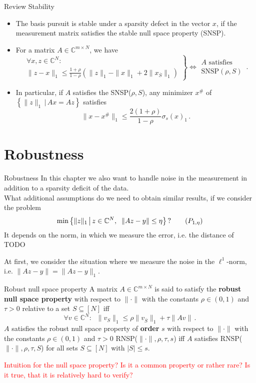 \documentclass[11pt]{beamer}
\newcommand{\CC}{\mathbb{C}}
\renewcommand{\emph}{\textbf}
\begin{document}
\begin{frame}{Review Stability}
	\begin{itemize}
		\item The basis pursuit is stable under a sparsity defect in the vector \(x\), if the measurement matrix satisfies the stable null space property (SNSP).
		\item For a matrix \(A\in\CC^{m\times N}\), we have
\[\left.\begin{array}{c}
\forall x,z\in \CC^N:\\
\|z-x\|_1\le \frac{1+\rho}{1-\rho}\left(\|z\|_1-\|x\|_1+2\|x_{\overline{S}}\|_1\right)
\end{array}\right\}
\iff 
\begin{array}{c}
A\text{ satisfies}\\
\text{SNSP}(\rho,S)
\end{array}
\,.\]
\item In particular, if \(A\) satisfies the SNSP($\rho,S$), any minimizer \(x^{\#}\) of \(\left\{\|z\|_1\,\big|\,Ax=Az\right\}\) satisfies 
\[\|x-x^{\#}\|_1\le \frac{2(1+\rho)}{1-\rho}\sigma_s(x)_1\,.\]
	\end{itemize}
\end{frame}

\section{Robustness}

\begin{frame}{Robustness}
In this chapter we also want to handle noise in the measurement in addition to a sparsity deficit of the data.\\
 What additional assumptions do we need to obtain similar results, if we consider the problem
 \[\min\left\{\|z\|_1\,\big|\,z\in \CC^N,\;\;\|Az-y\|\le \eta\right\}\,?\tag{$P_{1,\eta}$}\]
 It depends on the norm, in which we measure the error, i.e. the distance of TODO
\end{frame}


\begin{frame}{}

    At first, we consider the situation where we measure the noise in the \(\ell^1\)-norm, i.e. \(\|Az-y\|=\|Az-y\|_1\).
    \begin{Def}
    {Robust null space property}{} A matrix \(A\in\CC^{m\times N}\) is said to satisfy the \emph{robust null space property} with respect to \(\|\cdot\|\) with the constants \(\rho\in (0,1)\) and \(\tau>0\) relative to a set \(S\subseteq[N]\) iff
    \[\forall v\in \CC^N:\;\; \|v_S\|_1\le \rho\|v_{\overline S}\|_1+\tau \|Av\|\,.\tag{RNSP($\|\cdot\|,\rho,\tau,S$)}\]
    \(A \) satisfies the robust null space property of \emph{order} \(s\) with respect to \(\|\cdot\|\) with the constants \(\rho\in (0,1)\) and \(\tau>0\) RNSP(\(\|\cdot\|,\rho,\tau, s\)) iff \(A \) satisfies RNSP(\(\|\cdot\|,\rho,\tau,S\)) for all sets \(S\subseteq[N]\) with \(|S|\le s\).
    \end{Def}
    \textcolor{red}{Intuition for the null space property? Is it a common property or rather rare? Is it true, that it is relatively hard to verify?}
\end{frame}
\end{document}
